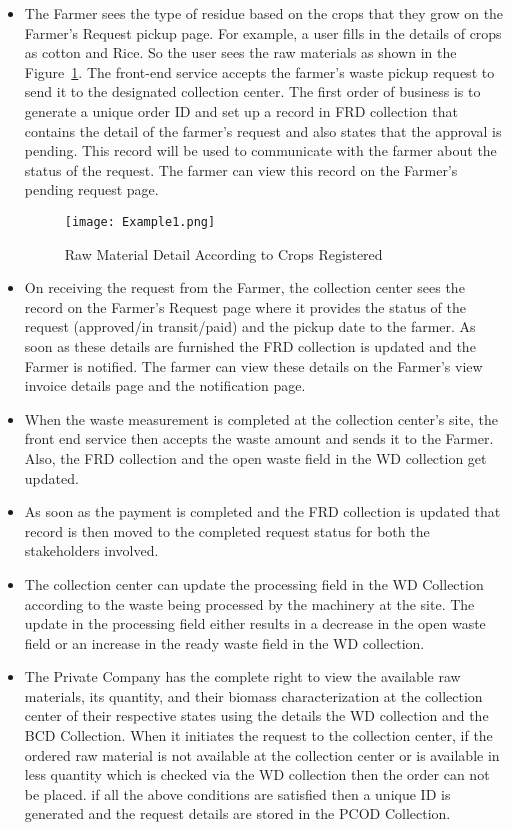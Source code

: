 \documentclass[conference]{IEEEtran}
\begin{document}
\begin{itemize}
\item The Farmer sees the type of residue based on the crops that they grow on the Farmer's Request pickup page. For example, a user fills in the details of crops as cotton and Rice. So the user sees the raw materials as shown in the Figure~\ref{fig:16}. The front-end service accepts the farmer’s waste pickup request to send it to the designated collection center. The first order of business is to generate a unique order ID and set up a record in FRD collection that contains the detail of the farmer’s request and also states that the approval is pending. This record will be used to communicate with the farmer about the status of the request. The farmer can view this record on the Farmer's pending request page.
\begin{figure}[htbp]
\centerline{\texttt{[image: Example1.png]}}
\caption{Raw Material Detail According to Crops Registered}
\label{fig:16}
\end{figure}
\item On receiving the request from the Farmer, the collection center sees the record on the Farmer's Request page where it provides the status of the request (approved/in transit/paid) and the pickup date to the farmer. As soon as these details are furnished the FRD collection is updated and the Farmer is notified. The farmer can view these details on the Farmer's view invoice details page and the notification page. 
\item When the waste measurement is completed at the collection center's site, the front end service then accepts the waste amount and sends it to the Farmer. Also, the FRD collection and the open waste field in the WD collection get updated.
\item As soon as the payment is completed and the FRD collection is updated that record is then moved to the completed request status for both the stakeholders involved. 
\item The collection center can update the processing field in the WD Collection according to the waste being processed by the machinery at the site. The update in the processing field either results in a decrease in the open waste field or an increase in the ready waste field in the WD collection.
\item The Private Company has the complete right to view the available raw materials, its quantity, and their biomass characterization at the collection center of their respective states using the details the WD collection and the BCD Collection. When it initiates the request to the collection center, if the ordered raw material is not available at the collection center or is available in less quantity which is checked via the WD collection then the order can not be placed. if all the above conditions are satisfied then a unique ID is generated and the request details are stored in the PCOD Collection.

\end{itemize}
\end{document}
